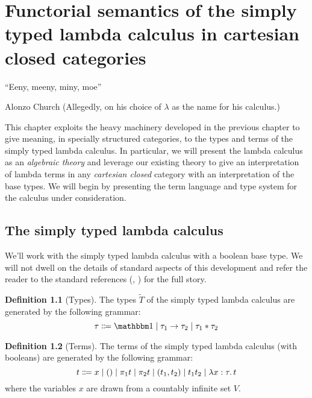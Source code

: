\documentclass[12pt,twoside]{reedthesis}
\theoremstyle{definition}
\newtheorem{definition}{Definition}
\theoremstyle{remark}
\theoremstyle{plain}
\begin{document}
\chapter{Functorial semantics of the simply typed lambda calculus in cartesian closed categories}\label{chapter:stlc}
\epigraph{``Eeny, meeny, miny, moe''}{Alonzo Church (Allegedly, on his choice of
  $\lambda$ as the name for his calculus.)}

This chapter exploits the heavy machinery developed in the previous chapter to
give meaning, in specially structured categories, to the types and terms of the
simply typed lambda calculus. In particular, we will present the lambda calculus
as an \emph{algebraic theory} and leverage our existing theory to give an
interpretation of lambda terms in any \emph{cartesian closed} category with an
interpretation of the base types. We will begin by presenting the term language
and type system for the calculus under consideration.

\section{The simply typed lambda calculus}
We'll work with the simply typed lambda calculus with a boolean base type. We
will not dwell on the details of standard aspects of this development and refer
the reader to the standard references (\cite{pierce_types_2002},
\cite{harper_practical_2016}) for the full story.

\newcommand{\types}{\widetilde{T}}

\begin{definition}[Types]\label{def:stlc_types}
  The types \( \types \) of the simply typed lambda calculus are
  generated by the following grammar:
  \[
    \tau \Coloneqq \termob \mid \tau_{1} \rightarrow \tau_{2} \mid \tau_{1} * \tau_{2}
  \]
\end{definition}

\begin{definition}[Terms]
  The terms of the simply typed lambda calculus (with booleans) are generated by the
  following grammar:
  \[
    t \Coloneq x \mid () \mid \pi_{1} t \mid \pi_{2} t \mid (t_{1}, t_{2}) \mid t_{1} t_{2} \mid \abstr{x}{\tau}{t}
  \]
  where the variables $x$ are drawn from a countably infinite set \( V \).
\end{definition}
\end{document}
